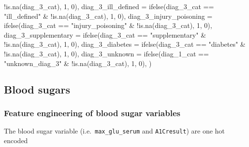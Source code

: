 \documentclass[
]{article}
\newenvironment{Shaded}{\begin{snugshade}}{\end{snugshade}}
\newcommand{\AttributeTok}[1]{\textcolor[rgb]{0.77,0.63,0.00}{#1}}
\newcommand{\DecValTok}[1]{\textcolor[rgb]{0.00,0.00,0.81}{#1}}
\newcommand{\FunctionTok}[1]{\textcolor[rgb]{0.00,0.00,0.00}{#1}}
\newcommand{\NormalTok}[1]{#1}
\newcommand{\SpecialCharTok}[1]{\textcolor[rgb]{0.00,0.00,0.00}{#1}}
\newcommand{\StringTok}[1]{\textcolor[rgb]{0.31,0.60,0.02}{#1}}
\begin{document}
\begin{Shaded}
\begin{Highlighting}[]
            \SpecialCharTok{!}\FunctionTok{is.na}\NormalTok{(diag\_3\_cat), }\DecValTok{1}\NormalTok{, }\DecValTok{0}\NormalTok{), }\AttributeTok{diag\_3\_ill\_defined =} \FunctionTok{ifelse}\NormalTok{(diag\_3\_cat }\SpecialCharTok{==}
            \StringTok{"ill\_defined"} \SpecialCharTok{\&} \SpecialCharTok{!}\FunctionTok{is.na}\NormalTok{(diag\_3\_cat), }\DecValTok{1}\NormalTok{,}
            \DecValTok{0}\NormalTok{), }\AttributeTok{diag\_3\_injury\_poisoning =} \FunctionTok{ifelse}\NormalTok{(diag\_3\_cat }\SpecialCharTok{==}
            \StringTok{"injury\_poisoning"} \SpecialCharTok{\&} \SpecialCharTok{!}\FunctionTok{is.na}\NormalTok{(diag\_3\_cat),}
            \DecValTok{1}\NormalTok{, }\DecValTok{0}\NormalTok{), }\AttributeTok{diag\_3\_supplementary =} \FunctionTok{ifelse}\NormalTok{(diag\_3\_cat }\SpecialCharTok{==}
            \StringTok{"supplementary"} \SpecialCharTok{\&} \SpecialCharTok{!}\FunctionTok{is.na}\NormalTok{(diag\_3\_cat), }\DecValTok{1}\NormalTok{,}
            \DecValTok{0}\NormalTok{), }\AttributeTok{diag\_3\_diabetes =} \FunctionTok{ifelse}\NormalTok{(diag\_3\_cat }\SpecialCharTok{==}
            \StringTok{"diabetes"} \SpecialCharTok{\&} \SpecialCharTok{!}\FunctionTok{is.na}\NormalTok{(diag\_3\_cat), }\DecValTok{1}\NormalTok{, }\DecValTok{0}\NormalTok{),}
        \AttributeTok{diag\_3\_unknown =} \FunctionTok{ifelse}\NormalTok{(diag\_1\_cat }\SpecialCharTok{==} \StringTok{"unknown\_diag\_3"} \SpecialCharTok{\&}
            \SpecialCharTok{!}\FunctionTok{is.na}\NormalTok{(diag\_3\_cat), }\DecValTok{1}\NormalTok{, }\DecValTok{0}\NormalTok{), )}
\end{Highlighting}
\end{Shaded}

\hypertarget{blood-sugars}{%
\subsection{Blood sugars}\label{blood-sugars}}

\hypertarget{feature-engineering-of-blood-sugar-variables}{%
\subsubsection{Feature engineering of blood sugar
variables}\label{feature-engineering-of-blood-sugar-variables}}

The blood sugar variable (i.e.~\texttt{max\_glu\_serum} and
\texttt{A1Cresult}) are one hot encoded
\end{document}
